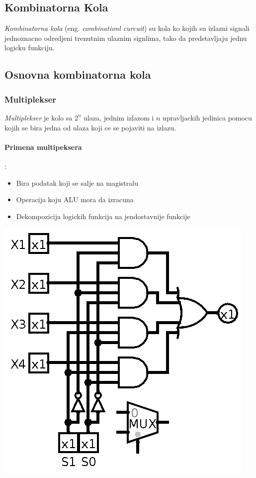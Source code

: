 \documentclass[12p,a4paper]{article}
\begin{document}
\begin{multicols}{2}
    \section{Kombinatorna Kola}

    \emph{Kombinatorna kola} (eng. \emph{combinationl curcuit}) su kola ko 
    kojih su izlazni signali jednoznacno odredjeni trenutnim ulaznim signlima, 
    tako da predstavljaju jednu logicku funkciju.

    \subsection{Osnovna kombinatorna kola}

    \subsubsection{Multiplekser}

    \emph{Multiplekser} je kolo sa $2^n$ ulaza, jednim izlazom i $n$ 
    upravljackih jedinica pomocu kojih se bira jedna od ulaza koji ce se 
    pojaviti na izlazu.
    
    \paragraph{Primena multipeksera}:
    \begin{itemize}
        \itemsep0em
        \item Bira podatak koji se salje na magistralu
        \item Operacija koju ALU mora da izracuna
        \item Dekompozicija logickih funkcija na jendostavnije funkcije
    \end{itemize}
    \includegraphics[width=0.7\columnwidth]{Figures/mux.png}


\end{multicols}
\end{document}
